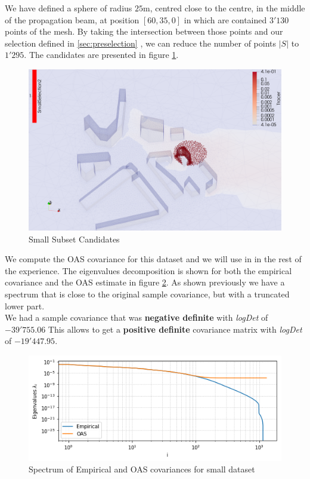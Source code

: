 We have defined a sphere of radius $25$m, centred close to the centre, in the middle of the propagation beam, at position $[60,35,0]$ in which are contained $3'130$ points of the mesh. By taking the intersection between those points and our selection defined in \ref{sec:preselection} , we can reduce the number of points $|S|$ to $1'295$.  The candidates are presented in figure      \ref{fig:smallset:position}.
 \\

\begin{figure}[h!]
\centering
    \includegraphics[width=0.8\linewidth]{figures/CompAlg/3rd/non_centered_60.35.0/candidates_screenshot}
    \caption{Small Subset Candidates}
    \label{fig:smallset:position}
\end{figure}

We compute the OAS covariance for this dataset and we will use in in the rest of the experience. The eigenvalues decomposition is shown for both the empirical covariance and the OAS estimate in figure \ref{fig:small_cov_eig}. As shown previously we have a spectrum that is close to the original sample covariance, but with a truncated lower part. \\

We had a sample covariance that was \textbf{negative definite} with \textit{logDet} of $-39'755.06$ This allows to get a \textbf{positive definite} covariance matrix with \textit{logDet} of $-19'447.95$.  \\

\begin{figure}[h!]
\centering
    \includegraphics[width=0.8\linewidth]{figures/CompAlg/covarianceEmpOAS}
    \caption{Spectrum of Empirical and OAS covariances for small dataset}
    \label{fig:small_cov_eig}
\end{figure}

